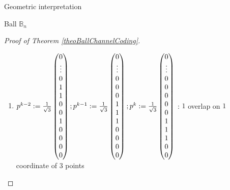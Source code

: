 \documentclass{article}
\theoremstyle{definition}
\theoremstyle{remark}
\begin{document}
\begin{subsection}{Geometric interpretation}
\begin{subsubsection}{Ball $\mathbb{B}_n$}
\begin{proof}[Proof of Theorem \ref{theoBallChannelCoding}]
\begin{itemize}
\begin{enumerate}
      \item $p^{k-2} := \frac{1}{\sqrt{3}}\pmqty{0\\\vdots\\0\\1\\1\\0\\0\\1\\0\\0\\0\\0} ; p^{k-1} := \frac{1}{\sqrt{3}}\pmqty{0\\\vdots\\0\\0\\0\\1\\1\\1\\0\\0\\0\\0} ; p^k := \frac{1}{\sqrt{3}}\pmqty{0\\\vdots\\0\\0\\0\\0\\0\\1\\1\\1\\0\\0}$ : $1$ overlap on $1$ coordinate of $3$ points
      \end{enumerate}


\end{itemize}
\end{proof}
\end{subsubsection}
\end{subsection}
\end{document}
